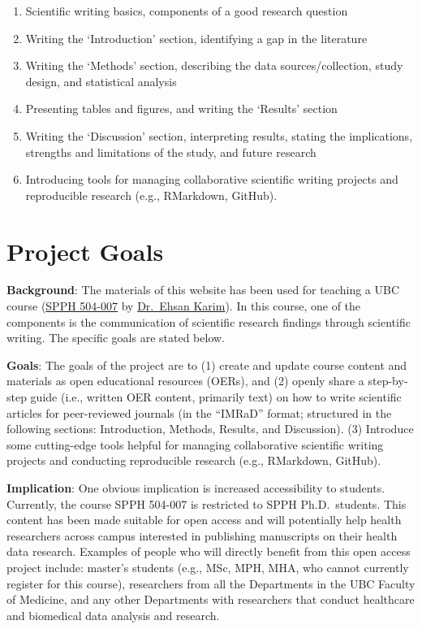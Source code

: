 \documentclass[
]{book}
\providecommand{\tightlist}{%
  \setlength{\itemsep}{0pt}\setlength{\parskip}{0pt}}
\begin{document}
\begin{enumerate}
\def\labelenumi{\arabic{enumi}.}
\tightlist
\item
  Scientific writing basics, components of a good research question
\item
  Writing the `Introduction' section, identifying a gap in the literature
\item
  Writing the `Methods' section, describing the data sources/collection, study design, and statistical analysis
\item
  Presenting tables and figures, and writing the `Results' section
\item
  Writing the `Discussion' section, interpreting results, stating the implications, strengths and limitations of the study, and future research
\item
  Introducing tools for managing collaborative scientific writing projects and reproducible research (e.g., RMarkdown, GitHub).
\end{enumerate}

\hypertarget{project-goals}{%
\section*{Project Goals}\label{project-goals}}

\textbf{Background}: The materials of this website has been used for teaching a UBC course (\href{https://ehsank.com/teaching/}{SPPH 504-007} by \href{https://ehsank.com/}{Dr.~Ehsan Karim}). In this course, one of the components is the communication of scientific research findings through scientific writing. The specific goals are stated below.

\textbf{Goals}: The goals of the project are to (1) create and update course content and materials as open educational resources (OERs), and (2) openly share a step-by-step guide (i.e., written OER content, primarily text) on how to write scientific articles for peer-reviewed journals (in the ``IMRaD'' format; structured in the following sections: Introduction, Methods, Results, and Discussion). (3) Introduce some cutting-edge tools helpful for managing collaborative scientific writing projects and conducting reproducible research (e.g., RMarkdown, GitHub).

\textbf{Implication}: One obvious implication is increased accessibility to students. Currently, the course SPPH 504-007 is restricted to SPPH Ph.D.~students. This content has been made suitable for open access and will potentially help health researchers across campus interested in publishing manuscripts on their health data research. Examples of people who will directly benefit from this open access project include: master's students (e.g., MSc, MPH, MHA, who cannot currently register for this course), researchers from all the Departments in the UBC Faculty of Medicine, and any other Departments with researchers that conduct healthcare and biomedical data analysis and research.
\end{document}
